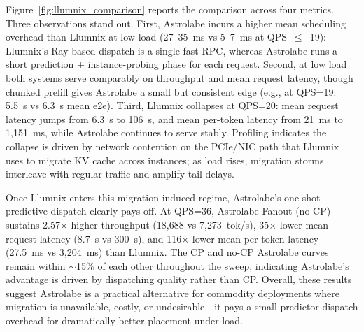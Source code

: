 Figure~\ref{fig:llumnix_comparison} reports the comparison across four metrics. Three observations stand out. First, Astrolabe incurs a higher mean scheduling overhead than Llumnix at low load (27--35~ms vs 5--7~ms at QPS~$\le$~19): Llumnix's Ray-based dispatch is a single fast RPC, whereas Astrolabe runs a short prediction + instance-probing phase for each request. Second, at low load both systems serve comparably on throughput and mean request latency, though chunked prefill gives Astrolabe a small but consistent edge (e.g., at QPS=19: 5.5~s vs 6.3~s mean e2e). Third, Llumnix collapses at QPS=20: mean request latency jumps from 6.3~s to 106~s, and mean per-token latency from 21~ms to 1{,}151~ms, while Astrolabe continues to serve stably. Profiling indicates the collapse is driven by network contention on the PCIe/NIC path that Llumnix uses to migrate KV cache across instances; as load rises, migration storms interleave with regular traffic and amplify tail delays.

Once Llumnix enters this migration-induced regime, Astrolabe's one-shot predictive dispatch clearly pays off. At QPS=36, Astrolabe-Fanout (no CP) sustains 2.57$\times$ higher throughput (18{,}688 vs 7{,}273~tok/s), 35$\times$ lower mean request latency (8.7~s vs 300~s), and 116$\times$ lower mean per-token latency (27.5~ms vs 3{,}204~ms) than Llumnix. The CP and no-CP Astrolabe curves remain within $\sim$15\% of each other throughout the sweep, indicating Astrolabe's advantage is driven by dispatching quality rather than CP. Overall, these results suggest Astrolabe is a practical alternative for commodity deployments where migration is unavailable, costly, or undesirable---it pays a small predictor-dispatch overhead for dramatically better placement under load.
